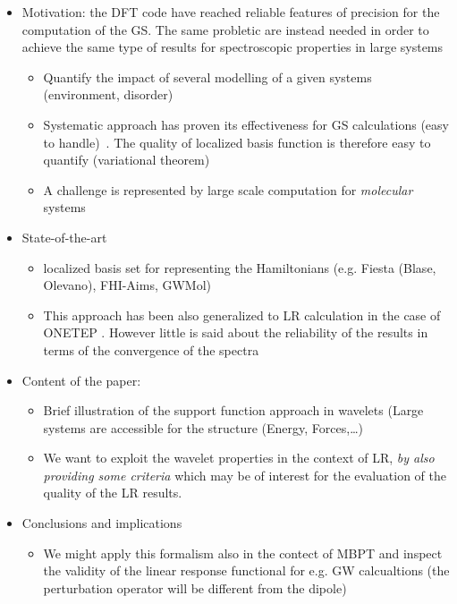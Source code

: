 \documentclass[a4paper]{article}
\begin{document}
\begin{itemize}
\item Motivation: the DFT code have reached reliable features of precision for the computation of the GS. The same probletic are instead needed in order to achieve the same type of results for spectroscopic properties in large systems
\begin{itemize}
\item Quantify the impact of several modelling of a given systems (environment, disorder)
\item Systematic approach has proven its effectiveness for GS calculations (easy to handle)~\cite{deltatest2016}. The quality of localized basis function is therefore easy to quantify (variational theorem)
\item A challenge is represented by large scale computation for \emph{molecular} systems
\end{itemize}
\item State-of-the-art 
\begin{itemize}
\item localized basis set for representing the Hamiltonians (e.g. Fiesta (Blase, Olevano), FHI-Aims, GWMol)
\item This approach has been also generalized to LR calculation in the case of ONETEP \cite{Ratcliff2013}. However little is said about the reliability of the results in terms of the convergence of the spectra
\end{itemize}
\item Content of the paper: 
\begin{itemize}
\item Brief illustration of the support function approach in wavelets (Large systems are  accessible for the structure (Energy, Forces,\ldots)
\item We want to exploit the wavelet properties in the context of LR, \emph{by also providing some criteria} which may be of interest for the evaluation of the quality of the LR results.
\end{itemize}
\item Conclusions and implications
\begin{itemize}
\item We might apply this formalism also in the contect of MBPT and inspect the validity of the linear response functional for e.g. GW calcualtions (the perturbation operator will be different from the dipole)
\end{itemize}
\end{itemize}
\end{document}
